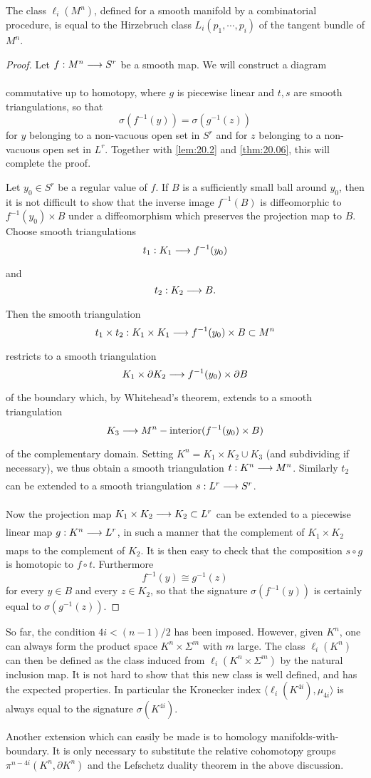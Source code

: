 \documentclass[../main]{subfiles}
\begin{document}
\begin{theorem}
\label{thm:20.07}
The class $\ell_i(M^n)$, defined for a smooth manifold by a combinatorial procedure, is equal to the Hirzebruch class $L_i(p_1,\cdots,p_i)$ of the tangent bundle of $M^n$.
\end{theorem}
\begin{proof}
Let $f:M^n \varrightarrow{} S^r$ be a smooth map. We will construct a diagram
\begin{center}
\end{center}
commutative up to homotopy, where $g$ is piecewise linear and $t,s$ are smooth triangulations, so that \[\sigma(f^{-1}(y)) = \sigma(g^{-1}(z))\] for $y$ belonging to a non-vacuous open set in $S^r$ and for $z$ belonging to a non-vacuous open set in $L^r$. Together with \ref{lem:20.2} and \ref{thm:20.06}, this will complete the proof.

Let $y_0 \in S^r$ be a regular value of $f$. If $B$ is a sufficiently small ball around $y_0$, then it is not difficult to show that the inverse image $f^{-1}(B)$ is diffeomorphic to $f^{-1}(y_0) \times B$ under a diffeomorphism which preserves the projection map to $B$. Choose smooth triangulations \[t_1:K_1 \varrightarrow{} f^{-1}(y_0)\] and \[t_2:K_2 \varrightarrow{} B.\] Then the smooth triangulation \[t_1 \times t_2:K_1 \times K_1 \varrightarrow{} f^{-1}(y_0) \times B \subset M^n\] restricts to a smooth triangulation \[K_1 \times \partial K_2 \varrightarrow{} f^{-1}(y_0) \times \partial B \] of the boundary which, by Whitehead's theorem, extends to a smooth triangulation \[K_3 \varrightarrow{} M^n - \text{interior}(f^{-1}(y_0)\times B)\] of the complementary domain. Setting $K^n = K_1 \times K_2 \cup K_3$ (and subdividing if necessary), we thus obtain a smooth triangulation $t:K^n \varrightarrow{} M^n$. Similarly $t_2$ can be extended to a smooth triangulation $s:L^r \varrightarrow{} S^r$.

Now the projection map $K_1 \times K_2 \varrightarrow{} K_2 \subset L^r$ can be extended to a piecewise linear map $g:K^n \varrightarrow{} L^r$, in such a manner that the complement of $K_1 \times K_2$ maps to the complement of $K_2$. It is then easy to check that the composition $s \circ g$ is homotopic to $f \circ t$. Furthermore \[f^{-1}(y) \cong g^{-1}(z)\] for every $y \in B$ and every $z \in K_2$, so that the signature $\sigma(f^{-1}(y))$ is certainly equal to $\sigma(g^{-1}(z))$.
\end{proof}
So far, the condition $4i < (n-1)/2$ has been imposed. However, given $K^n$, one can always form the product space $K^n \times \Sigma^m$ with $m$ large. The class $\ell_i(K^n)$ can then be defined as the class induced from $\ell_i(K^n \times \Sigma^m)$ by the natural inclusion map. It is not hard to show that this new class is well defined, and has the expected properties. In particular the Kronecker index $\langle \ell_i(K^{4i}),\mu_{4i}\rangle$ is always equal to the signature $\sigma(K^{4i})$.

Another extension which can easily be made is to homology manifolds-with-boundary. It is only necessary to substitute the relative cohomotopy groups $\pi^{n-4i}(K^n,\partial K^n)$ and the Lefschetz duality theorem in the above discussion.
\end{document}
